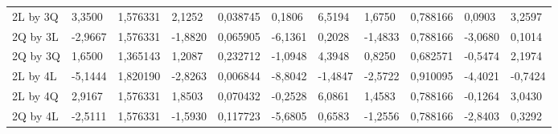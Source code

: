 \begin{table}[H]
{\begin{tabular}{lllllllllll}
\rowcolor[HTML]{FFFFFF} 
{\color[HTML]{000000} 2L by 3Q}       & {\color[HTML]{FF0000} 3,3500}   & {\color[HTML]{FF0000} 1,576331} & {\color[HTML]{FF0000} 2,1252}   & {\color[HTML]{FF0000} 0,038745} & {\color[HTML]{FF0000} 0,1806}         & {\color[HTML]{FF0000} 6,5194}         & {\color[HTML]{FF0000} 1,6750}   & {\color[HTML]{FF0000} 0,788166}      & {\color[HTML]{FF0000} 0,0903}         & {\color[HTML]{FF0000} 3,2597}         \\
\rowcolor[HTML]{FFFFFF} 
{\color[HTML]{000000} 2Q by 3L}       & {\color[HTML]{000000} -2,9667}  & {\color[HTML]{000000} 1,576331} & {\color[HTML]{000000} -1,8820}  & {\color[HTML]{000000} 0,065905} & {\color[HTML]{000000} -6,1361}        & {\color[HTML]{000000} 0,2028}         & {\color[HTML]{000000} -1,4833}  & {\color[HTML]{000000} 0,788166}      & {\color[HTML]{000000} -3,0680}        & {\color[HTML]{000000} 0,1014}         \\
\rowcolor[HTML]{FFFFFF} 
{\color[HTML]{000000} 2Q by 3Q}       & {\color[HTML]{000000} 1,6500}   & {\color[HTML]{000000} 1,365143} & {\color[HTML]{000000} 1,2087}   & {\color[HTML]{000000} 0,232712} & {\color[HTML]{000000} -1,0948}        & {\color[HTML]{000000} 4,3948}         & {\color[HTML]{000000} 0,8250}   & {\color[HTML]{000000} 0,682571}      & {\color[HTML]{000000} -0,5474}        & {\color[HTML]{000000} 2,1974}         \\
\rowcolor[HTML]{FFFFFF} 
{\color[HTML]{000000} 2L by 4L}       & {\color[HTML]{FF0000} -5,1444}  & {\color[HTML]{FF0000} 1,820190} & {\color[HTML]{FF0000} -2,8263}  & {\color[HTML]{FF0000} 0,006844} & {\color[HTML]{FF0000} -8,8042}        & {\color[HTML]{FF0000} -1,4847}        & {\color[HTML]{FF0000} -2,5722}  & {\color[HTML]{FF0000} 0,910095}      & {\color[HTML]{FF0000} -4,4021}        & {\color[HTML]{FF0000} -0,7424}        \\
\rowcolor[HTML]{FFFFFF} 
{\color[HTML]{000000} 2L by 4Q}       & {\color[HTML]{000000} 2,9167}   & {\color[HTML]{000000} 1,576331} & {\color[HTML]{000000} 1,8503}   & {\color[HTML]{000000} 0,070432} & {\color[HTML]{000000} -0,2528}        & {\color[HTML]{000000} 6,0861}         & {\color[HTML]{000000} 1,4583}   & {\color[HTML]{000000} 0,788166}      & {\color[HTML]{000000} -0,1264}        & {\color[HTML]{000000} 3,0430}         \\
\rowcolor[HTML]{FFFFFF} 
{\color[HTML]{000000} 2Q by 4L}       & {\color[HTML]{000000} -2,5111}  & {\color[HTML]{000000} 1,576331} & {\color[HTML]{000000} -1,5930}  & {\color[HTML]{000000} 0,117723} & {\color[HTML]{000000} -5,6805}        & {\color[HTML]{000000} 0,6583}         & {\color[HTML]{000000} -1,2556}  & {\color[HTML]{000000} 0,788166}      & {\color[HTML]{000000} -2,8403}        & {\color[HTML]{000000} 0,3292}         \\

\end{tabular}}
\end{table}
